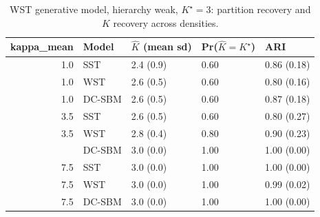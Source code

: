 \begin{table}
\centering
\caption{WST generative model, hierarchy weak, $K^\star=3$: partition recovery and $K$ recovery across densities.}
\centering
\begin{tabular}[t]{rllll}
\toprule
kappa_mean & Model & $\hat K$ (mean sd) & Pr($\hat K = K^\star$) & ARI\\
\midrule
1.0 & SST & 2.4 (0.9) & 0.60 & 0.86 (0.18)\\
1.0 & WST & 2.6 (0.5) & 0.60 & 0.80 (0.16)\\
1.0 & DC-SBM & 2.6 (0.5) & 0.60 & 0.87 (0.18)\\
3.5 & SST & 2.6 (0.5) & 0.60 & 0.80 (0.27)\\
3.5 & WST & 2.8 (0.4) & 0.80 & 0.90 (0.23)\\
\addlinespace
3.5 & DC-SBM & 3.0 (0.0) & 1.00 & 1.00 (0.00)\\
7.5 & SST & 3.0 (0.0) & 1.00 & 1.00 (0.00)\\
7.5 & WST & 3.0 (0.0) & 1.00 & 0.99 (0.02)\\
7.5 & DC-SBM & 3.0 (0.0) & 1.00 & 1.00 (0.00)\\
\bottomrule
\end{tabular}
\end{table}
